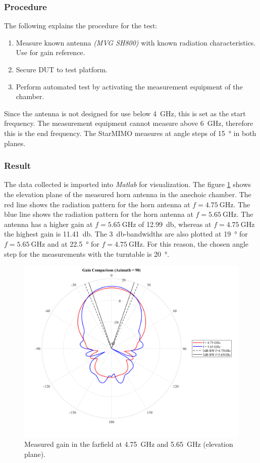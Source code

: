 \subsubsection{Procedure}
The following explains the procedure for the test:
\begin{enumerate}
    \item Measure known antenna \textit{(MVG SH800)} with known radiation characteristics. Use for gain reference.
    \item Secure DUT to test platform.
    \item Perform automated test by activating the measurement equipment of the chamber.
\end{enumerate}
Since the antenna is not designed for use below \SI{4}{\giga\hertz}, this is set as the start frequency. The measurement equipment cannot measure above \SI{6}{\giga\hertz}, therefore this is the end frequency. The StarMIMO measures at angle steps of \SI{15}{\degree} in both planes.

\subsubsection{Result}
The data collected is imported into \textit{Matlab} for visualization. The figure \ref{fig:horn_elevation} shows the elevation plane of the measured horn antenna in the anechoic chamber. The red line shows the radiation pattern for the horn antenna at $f=\SI{4.75}{\giga\hertz}$. The blue line shows the radiation pattern for the horn antenna at $f=\SI{5.65}{\giga\hertz}$. The antenna has a higher gain at $f=\SI{5.65}{\giga\hertz}$ of \SI{12.99}{\decibel}, whereas at $f=\SI{4.75}{\giga\hertz}$ the highest gain is \SI{11.41}{\decibel}. The \SI{3}{\decibel}-bandwidths are also plotted at \SI{19}{\degree} for $f=\SI{5.65}{\giga\hertz}$ and at \SI{22.5}{\degree} for $f=\SI{4.75}{\giga\hertz}$. For this reason, the chosen angle step for the measurements with the turntable is \SI{20}{\degree}.
\begin{figure}[H]
    \centering
    \includegraphics[width=1\textwidth]{figures/horn_elevation.png}
    \caption{Measured gain in the farfield at \SI{4.75}{\giga\hertz} and \SI{5.65}{\giga\hertz} (elevation plane).} 
    \label{fig:horn_elevation}
\end{figure}

